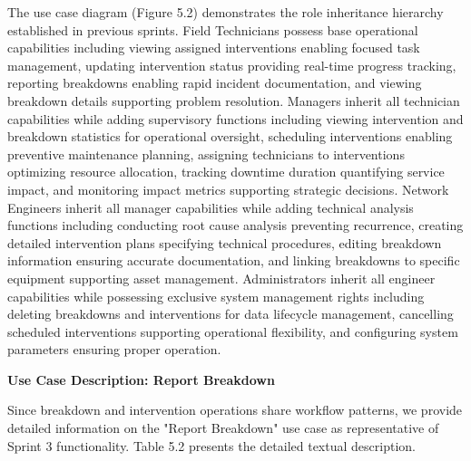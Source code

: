 The use case diagram (Figure 5.2) demonstrates the role inheritance hierarchy established in previous sprints. Field Technicians possess base operational capabilities including viewing assigned interventions enabling focused task management, updating intervention status providing real-time progress tracking, reporting breakdowns enabling rapid incident documentation, and viewing breakdown details supporting problem resolution. Managers inherit all technician capabilities while adding supervisory functions including viewing intervention and breakdown statistics for operational oversight, scheduling interventions enabling preventive maintenance planning, assigning technicians to interventions optimizing resource allocation, tracking downtime duration quantifying service impact, and monitoring impact metrics supporting strategic decisions. Network Engineers inherit all manager capabilities while adding technical analysis functions including conducting root cause analysis preventing recurrence, creating detailed intervention plans specifying technical procedures, editing breakdown information ensuring accurate documentation, and linking breakdowns to specific equipment supporting asset management. Administrators inherit all engineer capabilities while possessing exclusive system management rights including deleting breakdowns and interventions for data lifecycle management, cancelling scheduled interventions supporting operational flexibility, and configuring system parameters ensuring proper operation.

\textbf{Use Case Description: Report Breakdown}

Since breakdown and intervention operations share workflow patterns, we provide detailed information on the "Report Breakdown" use case as representative of Sprint 3 functionality. Table 5.2 presents the detailed textual description.

